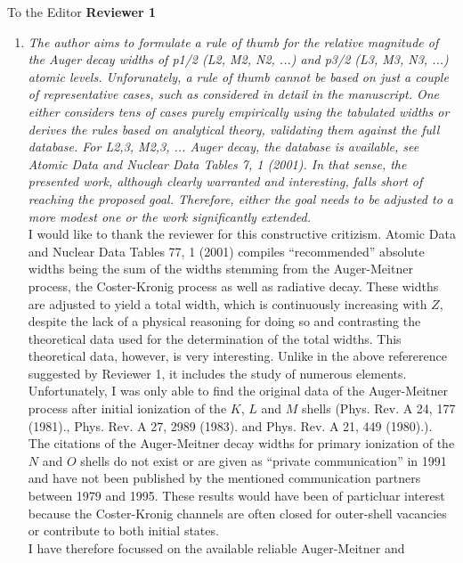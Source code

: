 \documentclass[DIN,pagenumber=false,parskip=half,fromalign=left,fromphone=false,fromemail=true,fromurl=false,fromlogo=false,fromrule=false]{scrlttr2}
\begin{document}
\begin{letter}{To the Editor}
\textbf{Reviewer 1}
\begin{enumerate}
 \item \emph{The author aims to formulate a rule of thumb for the relative magnitude of
       the Auger decay widths of p1/2 (L2, M2, N2, ...) and p3/2 (L3, M3, N3, ...)
       atomic levels. Unforunately, a rule of thumb cannot be based on just a couple
       of representative cases, such as considered in detail in the manuscript. One
       either considers tens of cases purely empirically using the tabulated widths or
       derives the rules based on analytical theory, validating them against the full
       database. For L2,3, M2,3, ... Auger decay, the database is available, see
       Atomic Data and Nuclear Data Tables 7, 1 (2001). In that sense, the presented
       work, although clearly warranted and interesting, falls short of reaching the
       proposed goal. Therefore, either the goal needs to be adjusted to a more modest
       one or the work significantly extended.}\\
       I would like to thank the reviewer for this constructive critizism.
       Atomic Data and Nuclear Data Tables 77, 1 (2001)
       compiles ``recommended'' absolute widths
       being the sum of the widths stemming from
       the Auger-Meitner process,
       the Coster-Kronig process as well as radiative decay. These widths are
       adjusted to yield a total width, which is continuously increasing with $Z$,
       despite the lack of a physical reasoning for doing so and contrasting the
       theoretical data used for the determination of the total widths. This theoretical
       data, however, is very interesting. Unlike in the above refererence suggested by
       Reviewer 1, it includes the study of numerous elements.
       Unfortunately, I was only able to find
       the original data of the Auger-Meitner process after initial ionization of the
       $K$, $L$ and $M$ shells (Phys. Rev. A 24, 177 (1981)., Phys. Rev. A 27, 2989 (1983).
       and Phys. Rev. A 21, 449 (1980).). The citations of the Auger-Meitner decay widths
       for primary ionization of the $N$ and $O$ shells do not exist or are given as
       ``private communication'' in 1991 and have not been published by the
       mentioned communication partners between 1979 and 1995. These results would have
       been of particluar interest because the Coster-Kronig channels are often
       closed for outer-shell vacancies or contribute to both initial states.\\
       I have therefore focussed on the available reliable Auger-Meitner and

\end{enumerate}
\end{letter}
\end{document}
